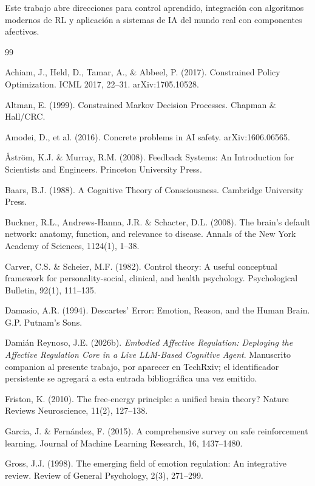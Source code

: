 \documentclass{article}
\begin{document}
Este trabajo abre direcciones para control aprendido, integración con algoritmos modernos de RL y aplicación a sistemas de IA del mundo real con componentes afectivos.

\begin{thebibliography}{99}

Achiam, J., Held, D., Tamar, A., \& Abbeel, P. (2017). Constrained Policy Optimization. ICML 2017, 22--31. arXiv:1705.10528.

Altman, E. (1999). Constrained Markov Decision Processes. Chapman \& Hall/CRC.

Amodei, D., et al. (2016). Concrete problems in AI safety. arXiv:1606.06565.

{\AA}str\"om, K.J. \& Murray, R.M. (2008). Feedback Systems: An Introduction for Scientists and Engineers. Princeton University Press.

Baars, B.J. (1988). A Cognitive Theory of Consciousness. Cambridge University Press.

Buckner, R.L., Andrews-Hanna, J.R. \& Schacter, D.L. (2008). The brain's default network: anatomy, function, and relevance to disease. Annals of the New York Academy of Sciences, 1124(1), 1--38.

Carver, C.S. \& Scheier, M.F. (1982). Control theory: A useful conceptual framework for personality-social, clinical, and health psychology. Psychological Bulletin, 92(1), 111--135.

Damasio, A.R. (1994). Descartes' Error: Emotion, Reason, and the Human Brain. G.P. Putnam's Sons.

Dami\'{a}n Reynoso, J.E. (2026b). \emph{Embodied Affective Regulation: Deploying the Affective Regulation Core in a Live LLM-Based Cognitive Agent}. Manuscrito companion al presente trabajo, por aparecer en TechRxiv; el identificador persistente se agregará a esta entrada bibliográfica una vez emitido.

Friston, K. (2010). The free-energy principle: a unified brain theory? Nature Reviews Neuroscience, 11(2), 127--138.

Garcia, J. \& Fern\'andez, F. (2015). A comprehensive survey on safe reinforcement learning. Journal of Machine Learning Research, 16, 1437--1480.

Gross, J.J. (1998). The emerging field of emotion regulation: An integrative review. Review of General Psychology, 2(3), 271--299.


\end{thebibliography}
\end{document}
